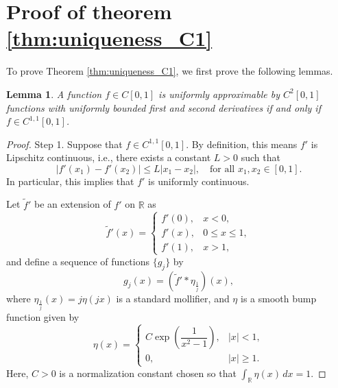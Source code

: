 \documentclass[11pt,reqno]{amsart}
\newtheorem{lemma}{Lemma}[section]
\theoremstyle{definition}
\theoremstyle{remark}
\numberwithin{equation}{section}
\begin{document}

\section{Proof of theorem \ref{thm:uniqueness_C1}}

To prove Theorem \ref{thm:uniqueness_C1}, we first prove the following lemmas.

\begin{lemma}\label{lem:C2 approximate C1}
	A function $f \in C[0,1]$ is uniformly approximable by $C^{2}[0,1]$ functions with uniformly bounded first and second derivatives if and only if $f\in C^{1,1}[0,1]$.
\end{lemma}

\begin{proof} Step 1. Suppose that $f \in C^{1,1}[0,1]$. By definition, this means $f'$ is Lipschitz continuous, i.e., there exists a constant $L > 0$ such that
\begin{equation*}
	|f'(x_1) - f'(x_2)| \leq L |x_1 - x_2|, \quad \text{for all } x_1, x_2 \in [0,1].
\end{equation*}
In particular, this implies that $f'$ is uniformly continuous.

Let $\tilde{f}'$ be an extension of $f'$ on $\mathbb{R}$ as
\begin{equation*}
	\tilde{f}'(x) = 	
	\begin{cases}
		 f'(0),  & x< 0,             \\
		 f'(x),           & 0 \leq x \leq 1, \\
		 f'(1),  & x>1,
	\end{cases}
\end{equation*}
and define a sequence of functions $\{g_j\}$ by
\begin{equation}\label{eq:modified sequence}
	g_j(x) = (\tilde{f}' \ast \eta_{\frac{1}{j}})(x),
\end{equation}
where $\eta_{\frac{1}{j}}(x) = j\eta(jx)$ is a standard mollifier, and $\eta$ is a smooth bump function given by
\begin{equation*}
	\eta(x) =
	\begin{cases}
		C \exp\left(\dfrac{1}{x^2 - 1}\right), & |x| < 1, \\
		0, & |x| \geq 1.
	\end{cases}
\end{equation*}
Here, $C > 0$ is a normalization constant chosen so that $\int_{\mathbb{R}} \eta(x) \, dx = 1$.


\end{proof}
\end{document}
